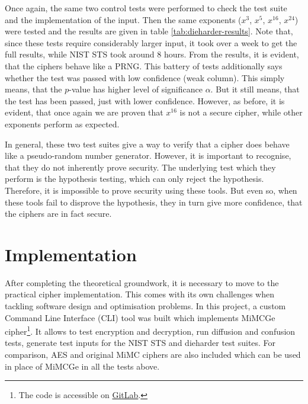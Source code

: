 \documentclass{Resources/UoBLab1}
\theoremstyle{definition}
\begin{document}
Once again, the same two control tests were performed to check the test suite and the implementation of the input. Then the same exponents ($x^3$, $x^5$, $x^{16}$, $x^{24}$) were tested and the results are given in table \ref{tab:dieharder-results}. Note that, since these tests require considerably larger input, it took over a week to get the full results, while NIST STS took around 8 hours. From the results, it is evident, that the ciphers behave like a PRNG. This battery of tests additionally says whether the test was passed with low confidence (weak column). This simply means, that the $p$-value has higher level of significance $\alpha$. But it still means, that the test has been passed, just with lower confidence. However, as before, it is evident, that once again we are proven that $x^{16}$ is not a secure cipher, while other exponents perform as expected.

In general, these two test suites give a way to verify that a cipher does behave like a pseudo-random number generator. However, it is important to recognise, that they do not inherently prove security. The underlying test which they perform is the hypothesis testing, which can only reject the hypothesis. Therefore, it is impossible to prove security using these tools. But even so, when these tools fail to disprove the hypothesis, they in turn give more confidence, that the ciphers are in fact secure.


\section{Implementation}\label{chapter:implementation}
After completing the theoretical groundwork, it is necessary to move to the practical cipher implementation. This comes with its own challenges when tackling software design and optimisation problems. In this project, a custom Command Line Interface (CLI) tool was built which implements MiMCGe cipher\footnote{\label{note:git}The code is accessible on \href{https://git.cs.bham.ac.uk/projects-2023-24/sxt063}{GitLab}.}. It allows to test encryption and decryption, run diffusion and confusion tests, generate test inputs for the NIST STS and dieharder test suites. For comparison, AES and original MiMC ciphers are also included which can be used in place of MiMCGe in all the tests above.
\end{document}
